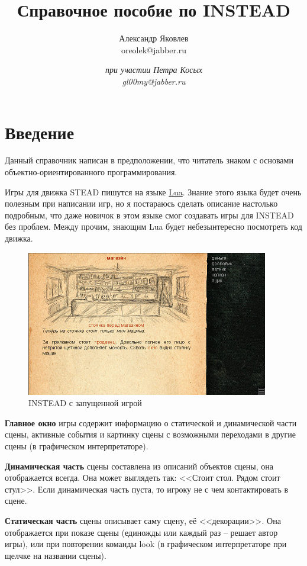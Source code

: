 \documentclass[a4paper,12pt]{article}
\begin{document}
\title{Справочное пособие по INSTEAD}
\author{Александр Яковлев\\oreolek@jabber.ru \and \textit{при участии Петра Косых}\\\textit{gl00my@jabber.ru}}
\maketitle
\tableofcontents
\clearpage
\section{Введение}
Данный справочник написан в предположении, что читатель знаком с основами объектно-ориентированного программирования.

Игры для движка STEAD пишутся на языке \href{http://www.lua.org}{Lua}. Знание этого языка будет очень полезным при написании игр, но я постараюсь сделать описание настолько подробным, что даже новичок в этом языке смог создавать игры для INSTEAD без проблем. Между прочим, знающим Lua будет небезынтересно посмотреть код движка.

\begin{figure}
\includegraphics[scale=0.7]{1.jpg}
\caption{INSTEAD с запущенной игрой}
\label{INSTEAD-running}
\end{figure}

\textbf{Главное окно} игры содержит информацию о статической и динамической части сцены, активные события и картинку сцены с возможными переходами в другие сцены (в графическом интерпретаторе).

\textbf{Динамическая часть} сцены составлена из описаний объектов сцены, она отображается всегда. Она может выглядеть так: <<Стоит стол. Рядом стоит стул>>. Если динамическая часть пуста, то игроку не с чем контактировать в сцене.

\textbf{Статическая часть} сцены описывает саму сцену, её <<декорации>>. Она отображается при показе сцены (единожды или каждый раз -- решает автор игры), или при повторении команды look (в графическом интерпретаторе при щелчке на названии сцены).
\end{document}
